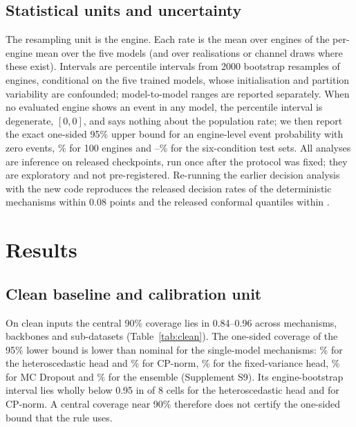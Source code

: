 \documentclass[11pt,a4paper]{article}
\newcommand{\JCleanCovAll}{0.84--0.96}
\begin{document}
\subsection{Statistical units and uncertainty}
The resampling unit is the engine. Each rate is the mean over engines of the per-engine mean over the five models (and over realisations or channel draws where these exist). Intervals are percentile intervals from 2000 bootstrap resamples of engines, conditional on the five trained models, whose initialisation and partition variability are confounded; model-to-model ranges are reported separately. When no evaluated engine shows an event in any model, the percentile interval is degenerate, $[0,0]$, and says nothing about the population rate; we then report the exact one-sided 95\% upper bound for an engine-level event probability with zero events, \RVZeroUpperOne\% for 100 engines and \RVZeroUpperTwo--\RVZeroUpperFour\% for the six-condition test sets. All analyses are inference on released checkpoints, run once after the protocol was fixed; they are exploratory and not pre-registered. Re-running the earlier decision analysis with the new code reproduces the released decision rates of the deterministic mechanisms within 0.08 points and the released conformal quantiles within \RVCPqDiff.

\section{Results}\label{sec:results}
\subsection{Clean baseline and calibration unit}\label{sec:clean}
On clean inputs the central 90\% coverage lies in \JCleanCovAll{} across mechanisms, backbones and sub-datasets (Table~\ref{tab:clean}). The one-sided coverage of the 95\% lower bound is lower than nominal for the single-model mechanisms: \RVCovOneNLL\% for the heteroscedastic head and \RVCovOneCP\% for CP-norm, \RVCovOneFix\% for the fixed-variance head, \RVCovOneMC\% for MC Dropout and \RVCovOneEns\% for the ensemble (Supplement S9). Its engine-bootstrap interval lies wholly below 0.95 in \RVCovOneNLLBelow{} of 8 cells for the heteroscedastic head and \RVCovOneCPBelow{} for CP-norm. A central coverage near 90\% therefore does not certify the one-sided bound that the rule uses.
\end{document}
